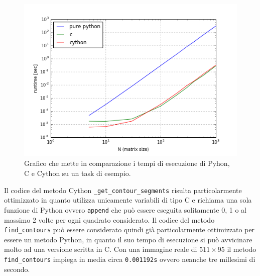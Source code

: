 \documentclass[12pt,a4paper]{report}
\begin{document}
\begin{figure}[H]
    \centering
    \includegraphics[scale=0.9]{img/cython-vs-c.png}
    \caption{Grafico che mette in comparazione i tempi di esecuzione di Pyhon, C e Cython su un task di esempio. 
}
\end{figure} 
Il codice del metodo Cython \verb|_get_contour_segments| risulta particolarmente ottimizzato in quanto utilizza unicamente variabili di tipo C e richiama una sola funzione di Python ovvero \verb|append| che può essere eseguita solitamente 0, 1 o al massimo 2 volte per ogni quadrato considerato. 
Il codice del metodo \verb|find_contours| può essere considerato quindi già particolarmente ottimizzato per essere un metodo Python, in quanto il suo tempo di esecuzione si può avvicinare molto ad una versione scritta in C. \newline
Con una immagine reale di $511\times 95$ il metodo \verb|find_contours| impiega in media circa \verb|0.001192s| %
ovvero neanche tre millesimi di secondo.
\end{document}
